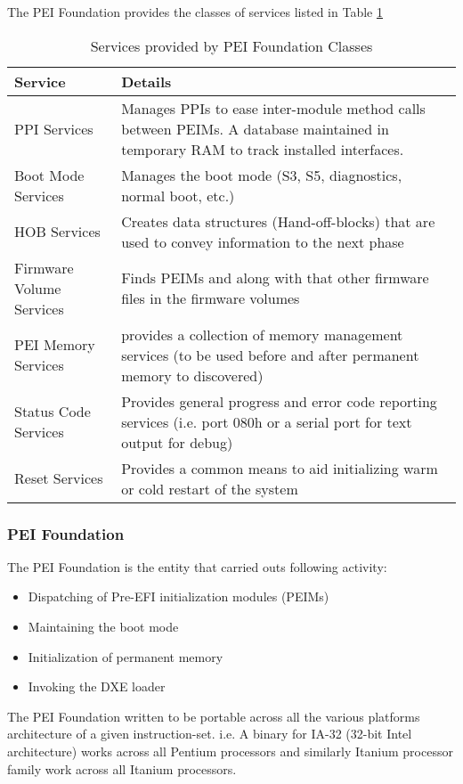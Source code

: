 The PEI Foundation provides the classes of services listed in Table \ref{table:design-pei-foundation-class-service}

\begin{table}[h]
	\centering
	\begin{tabular}{ l | p{8cm} }
		Service & Details
		\\ \hline \hline
		PPI Services & Manages PPIs to ease inter-module method calls between PEIMs. A database maintained in temporary RAM to track installed interfaces.
		\\ \hline
		Boot Mode Services & Manages the boot mode (S3, S5, diagnostics, normal boot, etc.)
		\\ \hline
		HOB Services & Creates data structures (Hand-off-blocks) that are used to convey information to the next phase 
		\\ \hline
		Firmware Volume Services & Finds PEIMs and along with that other firmware files in the firmware volumes
		\\ \hline
		PEI Memory Services & provides a collection of memory management services (to be used before and after permanent memory to discovered)
		\\ \hline
		Status Code Services & Provides general progress and error code reporting services (i.e. port 080h or a serial port for text output for debug)
		\\ \hline
		Reset Services & Provides a common means to aid initializing warm or cold restart of the system
		\\ \hline
	\end{tabular}
	\caption{Services provided by PEI Foundation Classes}\label{table:design-pei-foundation-class-service}
\end{table}


\subsubsection{PEI Foundation}
The PEI Foundation is the entity that carried outs following activity:
\begin{itemize}
	\item Dispatching of Pre-EFI initialization modules (PEIMs)
	\item Maintaining the boot mode
	\item Initialization of permanent memory
	\item Invoking the DXE loader 
\end{itemize}
The PEI Foundation written to be portable across all the various platforms architecture of a given instruction-set. i.e. A binary for IA-32 (32-bit Intel architecture) works across all Pentium processors and similarly Itanium processor family work across all Itanium processors.


